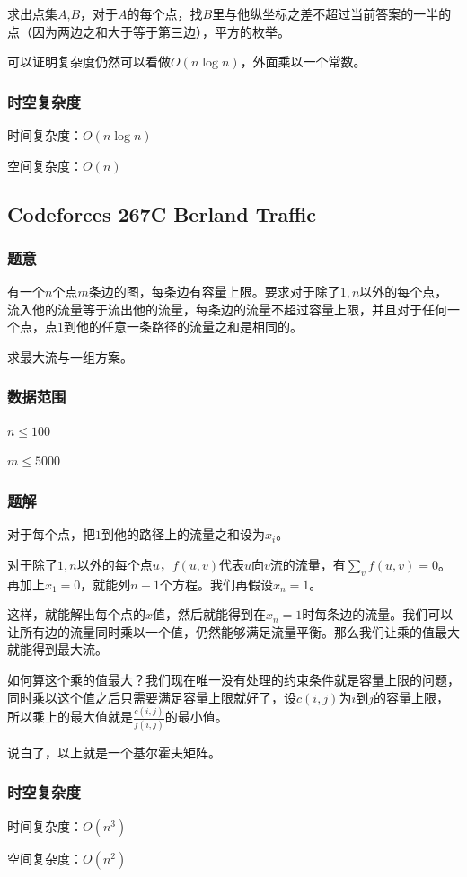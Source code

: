 \documentclass{ctexart}
\begin{document}
求出点集$A$,$B$，对于$A$的每个点，找$B$里与他纵坐标之差不超过当前答案的一半的点（因为两边之和大于等于第三边），平方的枚举。

可以证明复杂度仍然可以看做$O(n \log n)$，外面乘以一个常数。
\subsubsection{时空复杂度}
时间复杂度：$O(n \log n)$

空间复杂度：$O(n)$
\subsection{Codeforces 267C Berland Traffic}
\subsubsection{题意}
有一个$n$个点$m$条边的图，每条边有容量上限。要求对于除了$1,n$以外的每个点，流入他的流量等于流出他的流量，每条边的流量不超过容量上限，并且对于任何一个点，点$1$到他的任意一条路径的流量之和是相同的。

求最大流与一组方案。
\subsubsection{数据范围}
$n \le 100$

$m \le 5000$
\subsubsection{题解}
对于每个点，把$1$到他的路径上的流量之和设为$x_i$。

对于除了$1,n$以外的每个点$u$，$f(u,v)$代表$u$向$v$流的流量，有$\sum\limits_{v} f(u,v)=0$。再加上$x_1=0$，就能列$n-1$个方程。我们再假设$x_n=1$。

这样，就能解出每个点的$x$值，然后就能得到在$x_n=1$时每条边的流量。我们可以让所有边的流量同时乘以一个值，仍然能够满足流量平衡。那么我们让乘的值最大就能得到最大流。

如何算这个乘的值最大？我们现在唯一没有处理的约束条件就是容量上限的问题，同时乘以这个值之后只需要满足容量上限就好了，设$c(i,j)$为$i$到$j$的容量上限，所以乘上的最大值就是$\frac{c(i,j)}{f(i,j)}$的最小值。

说白了，以上就是一个基尔霍夫矩阵。
\subsubsection{时空复杂度}
时间复杂度：$O(n^3)$

空间复杂度：$O(n^2)$
\end{document}
